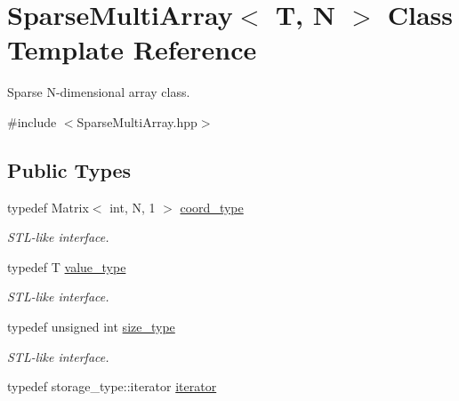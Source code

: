 \hypertarget{class_d_o_1_1_sparse_multi_array}{\section{Sparse\-Multi\-Array$<$ T, N $>$ Class Template Reference}
\label{class_d_o_1_1_sparse_multi_array}
}


Sparse N-\/dimensional array class.  




{\ttfamily \#include $<$Sparse\-Multi\-Array.\-hpp$>$}

\subsection*{Public Types}
\begin{DoxyCompactItemize}
\item 
\hypertarget{class_d_o_1_1_sparse_multi_array_ae4fb477425bbeb20329d300396ac2582}{typedef Matrix$<$ int, N, 1 $>$ \hyperlink{class_d_o_1_1_sparse_multi_array_ae4fb477425bbeb20329d300396ac2582}{coord\-\_\-type}}\label{class_d_o_1_1_sparse_multi_array_ae4fb477425bbeb20329d300396ac2582}

\begin{DoxyCompactList}\small\item\em S\-T\-L-\/like interface. \end{DoxyCompactList}\item 
\hypertarget{class_d_o_1_1_sparse_multi_array_a265a253612b46abed17c61b0a5e5ce30}{typedef T \hyperlink{class_d_o_1_1_sparse_multi_array_a265a253612b46abed17c61b0a5e5ce30}{value\-\_\-type}}\label{class_d_o_1_1_sparse_multi_array_a265a253612b46abed17c61b0a5e5ce30}

\begin{DoxyCompactList}\small\item\em S\-T\-L-\/like interface. \end{DoxyCompactList}\item 
\hypertarget{class_d_o_1_1_sparse_multi_array_ada51e68d31936547d3729c82daf6b7c6}{typedef unsigned int \hyperlink{class_d_o_1_1_sparse_multi_array_ada51e68d31936547d3729c82daf6b7c6}{size\-\_\-type}}\label{class_d_o_1_1_sparse_multi_array_ada51e68d31936547d3729c82daf6b7c6}

\begin{DoxyCompactList}\small\item\em S\-T\-L-\/like interface. \end{DoxyCompactList}\item 
\hypertarget{class_d_o_1_1_sparse_multi_array_aeb7d6a472fc07a6f5c9761e906c9f826}{typedef storage\-\_\-type\-::iterator \hyperlink{class_d_o_1_1_sparse_multi_array_aeb7d6a472fc07a6f5c9761e906c9f826}{iterator}}\label{class_d_o_1_1_sparse_multi_array_aeb7d6a472fc07a6f5c9761e906c9f826}


\end{DoxyCompactItemize}
